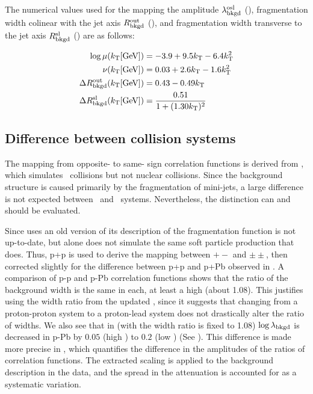 The numerical values used for the mapping the amplitude $\lambda_{\mathrm{bkgd}}^\mathrm{osl}$ (), fragmentation width colinear with the jet axis $R_{\mathrm{bkgd}}^\mathrm{out}$ (), and fragmentation width transverse to the jet axis $R_{\mathrm{bkgd}}^\mathrm{sl}$ () are as follows:

\begin{align}
\log \mu (k_\mathrm{T} [\textrm{GeV}]) &= -3.9 + 9.5 k_\mathrm{T} - 6.4 k_\mathrm{T}^2 \label{eqn:mu_osl}\\
\nu(k_\mathrm{T} [\textrm{GeV}]) &= 0.03 + 2.6 k_\mathrm{T} - 1.6 k_\mathrm{T}^2 \label{eqn:nu_osl}\\
\Delta R_{\mathrm{bkgd}}^\mathrm{out} (k_\mathrm{T} [\textrm{GeV}]) &= 0.43 - 0.49 k_\mathrm{T} \label{eqn_rbkgdout}\\
\Delta R_{\mathrm{bkgd}}^\mathrm{sl} (k_\mathrm{T} [\textrm{GeV}]) &= \frac{0.51}{1 + (1.30k_\mathrm{T})^2} \label{eqn_rbkgdsl}
\end{align}

\subsection{Difference between collision systems}

The mapping from opposite- to same- sign correlation functions is derived from , which simulates \pp~collisions but not nuclear collisions.
Since the background structure is caused primarily by the fragmentation of mini-jets, a large difference is not expected between \pp~and \pPb~systems.
Nevertheless, the distinction can and should be evaluated.

Since \Hijing uses an old version of  its description of the fragmentation function is not up-to-date, but \Pythia alone does not simulate the same soft particle production that \Hijing does.
Thus,  p+p is used to derive the mapping between $+-$ and $\pm\pm$, then corrected slightly for the difference between p+p and p+Pb observed in \Hijing.
A comparison of \Hijing p-p and p-Pb correlation functions shows that the ratio of the background width is the same in each, at least a high \kt (about 1.08).
This justifies using the width ratio from the updated , since it suggests that changing from a proton-proton system to a proton-lead system does not drastically alter the ratio of widths.
We also see that in \Hijing (with the width ratio is fixed to 1.08) $\log \lambda_{\mathrm{bkgd}}$ is decreased in p-Pb by $0.05$ (high \kt) to $0.2$ (low \kt) (See ). This difference is made more precise in , which quantifies the difference in the amplitudes of the ratios of correlation functions.
The extracted scaling is applied to the background description in the data, and the spread in the attenuation is accounted for as a systematic variation.

